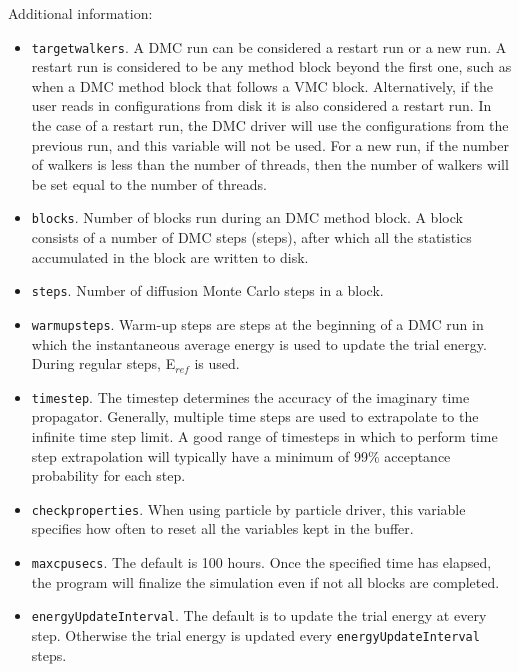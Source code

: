 Additional information:
\begin{itemize}
\item \texttt{targetwalkers}.  A DMC run can be considered a restart run or a new run.  A restart run is considered to be any method block beyond the first one, such as when a DMC method block that follows a VMC block.  Alternatively,  if the user reads in configurations from disk it is also considered a restart run.  In the case of a restart run, the DMC driver will use the configurations from the previous run, and this variable will not be used.  For a new run, if the number of walkers is less than the number of threads, then the number of walkers will be set equal to the number of threads.  

\item \texttt{blocks}. Number of blocks run during an DMC method block.  A block consists of a number of DMC steps (steps), after which all the statistics accumulated in the block are written to disk.

\item \texttt{steps}. Number of diffusion Monte Carlo steps in a block.

\item \texttt{warmupsteps}. Warm-up steps are steps at the beginning of a DMC run in which the 
instantaneous average energy is used to update the trial energy.  During regular steps, E$_{ref}$ is used.

\item \texttt{timestep}. The timestep determines the accuracy of the imaginary time propagator.  Generally, multiple time steps are used to extrapolate to the infinite time step limit.   A good range of timesteps  in which to perform time step extrapolation will typically have  a minimum of 99\% acceptance probability for each step.

\item \texttt{checkproperties}.  When using particle by particle driver, this variable specifies how often to reset all the variables kept in the buffer.

\item \texttt{maxcpusecs}. The default is 100 hours. Once the specified time has elapsed, the program will finalize the simulation even if not all blocks are completed.

\item \texttt{energyUpdateInterval}. The default is to update the trial energy at every step. Otherwise the trial energy is updated every \texttt{energyUpdateInterval} steps.


\end{itemize}
